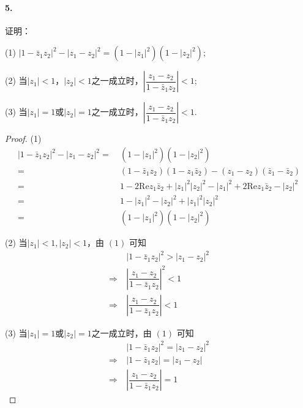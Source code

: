 \documentclass[12pt, a4paper, oneside]{ctexart}
\begin{document}
\paragraph{5.}证明：

(1) $|1-\bar{z}_1z_2|^2-|z_1-z_2|^2=(1-|z_1|^2)(1-|z_2|^2)$;

(2) 当$|z_1|<1$，$|z_2|<1$之一成立时，$\left|\dfrac{z_1-z_2}{1-\bar{z}_1z_2}\right|<1$;

(3) 当$|z_1|=1$或$|z_2|=1$之一成立时，$\left|\dfrac{z_1-z_2}{1-\bar{z}_1z_2}\right|<1$.

\begin{proof}
    (1) \begin{equation*}
        \begin{aligned}
            |1-\bar{z}_1z_2|^2-|z_1-z_2|^2=&\ (1-|z_1|^2)(1-|z_2|^2)\\
            =&\ (1-\bar{z}_1z_2)(1-z_1\bar{z}_2)-(z_1-z_2)(\bar{z}_1-\bar{z}_2)\\
            =&\ 1-2\text{Re}z_1\bar{z}_2+|z_1|^2|z_2|^2-|z_1|^2+2\text{Re}z_1\bar{z}_2-|z_2|^2\\
            =&\ 1-|z_1|^2-|z_2|^2+|z_1|^2|z_2|^2\\
            =&\ (1-|z_1|^2)(1-|z_2|^2)
        \end{aligned}
    \end{equation*}

    (2) 当$|z_1|<1,|z_2|<1$，由 $(1)$ 可知
    \begin{equation*}
        \begin{aligned}
            &\ |1-\bar{z}_1z_2|^2>|z_1-z_2|^2 \\
            \Rightarrow&\ \left|\dfrac{z_1-z_2}{1-\bar{z}_1z_2}\right|^2<1\\
            \Rightarrow&\ \left|\dfrac{z_1-z_2}{1-\bar{z}_1z_2}\right|<1
        \end{aligned}
    \end{equation*}

    (3) 当$|z_1| = 1$或$|z_2| = 1$之一成立时，由 $(1)$ 可知
    \begin{equation*}
        \begin{aligned}
            &\ |1-\bar{z}_1z_2|^2=|z_1-z_2|^2\\
            \Rightarrow&\ |1-\bar{z}_1z_2|=|z_1-z_2|\\
            \Rightarrow&\ \left|\dfrac{z_1-z_2}{1-\bar{z}_1z_2}\right|=1
        \end{aligned}
    \end{equation*}
\end{proof}
\end{document}
